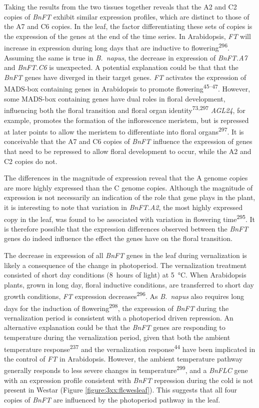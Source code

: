 \documentclass[12pt,]{book}
\begin{document}
Taking the results from the two tissues together reveals that the A2 and
C2 copies of \emph{BnFT} exhibit similar expression profiles, which are
distinct to those of the A7 and C6 copies. In the leaf, the factor
differentiating these sets of copies is the expression of the genes at
the end of the time series. In Arabidopsis, \emph{FT} will increase in
expression during long days that are inductive to
flowering\textsuperscript{296}. Assuming the same is true in
\emph{B.~napus}, the decrease in expression of \emph{BnFT.A7} and
\emph{BnFT.C6} is unexpected. A potential explanation could be that that
the \emph{BnFT} genes have diverged in their target genes. \emph{FT}
activates the expression of MADS-box containing genes in Arabidopsis to
promote flowering\textsuperscript{45--47}. However, some MADS-box
containing genes have dual roles in floral development, influencing both
the floral transition and floral organ identity\textsuperscript{73,297}
\emph{AGL24}, for example, promotes the formation of the inflorescence
meristem, but is repressed at later points to allow the meristem to
differentiate into floral organs\textsuperscript{297}. It is conceivable
that the A7 and C6 copies of \emph{BnFT} influence the expression of
genes that need to be repressed to allow floral development to occur,
while the A2 and C2 copies do not.

The differences in the magnitude of expression reveal that the A genome
copies are more highly expressed than the C genome copies. Although the
magnitude of expression is not necessarily an indication of the role
that gene plays in the plant, it is interesting to note that variation
in \emph{BnFT.A2}, the most highly expressed copy in the leaf, was found
to be associated with variation in flowering time\textsuperscript{295}.
It is therefore possible that the expression differences observed
between the \emph{BnFT} genes do indeed influence the effect the genes
have on the floral transition.

The decrease in expression of all \emph{BnFT} genes in the leaf during
vernalization is likely a consequence of the change in photoperiod. The
vernalization treatment consisted of short day conditions (8~hours of
light) at 5~°C. When Arabidopsis plants, grown in long day, floral
inductive conditions, are transferred to short day growth conditions,
\emph{FT} expression decreases\textsuperscript{296}. As \emph{B.~napus}
also requires long days for the induction of
flowering\textsuperscript{298}, the expression of \emph{BnFT} during the
vernalization period is consistent with a photoperiod driven repression.
An alternative explanation could be that the \emph{BnFT} genes are
responding to temperature during the vernalization period, given that
both the ambient temperature response\textsuperscript{237} and the
vernalization response\textsuperscript{44} have been implicated in the
control of \emph{FT} in Arabidopsis. However, the ambient temperature
pathway generally responds to less severe changes in
temperature\textsuperscript{299}, and a \emph{BnFLC} gene with an
expression profile consistent with \emph{BnFT} repression during the
cold is not present in Westar (Figure \ref{figure:3xx:flcwesleaf}). This
suggests that all four copies of \emph{BnFT} are influenced by the
photoperiod pathway in the leaf.
\end{document}
